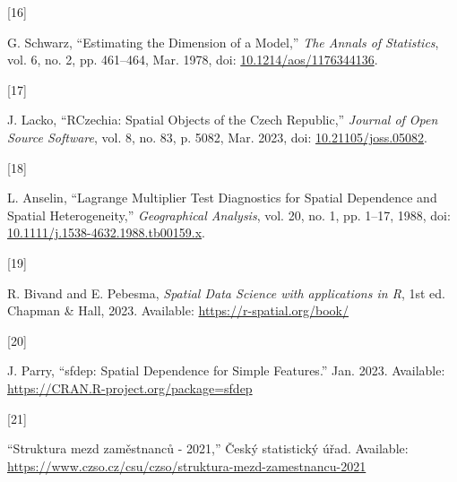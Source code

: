 \documentclass{mmeproc}
\newlength{\cslhangindent}
\newlength{\csllabelwidth}
\newenvironment{CSLReferences}[2] %
 {%
  \setlength{\parindent}{0pt}
  \ifodd #1
  \fi
  \setlength{\parskip}{-2pt}
 }%
 {}
\newcommand{\CSLLeftMargin}[1]{\parbox[t]{\csllabelwidth}{#1}}
\newcommand{\CSLRightInline}[1]{\parbox[t]{\linewidth - \csllabelwidth}{#1}\break}
\begin{document}
\begin{CSLReferences}{0}{0}
\leavevmode{}%
\CSLLeftMargin{{[}16{]} }%
\CSLRightInline{G. Schwarz, {``Estimating the {Dimension} of a
{Model},''} \emph{The Annals of Statistics}, vol. 6, no. 2, pp.
461--464, Mar. 1978, doi:
\href{https://doi.org/10.1214/aos/1176344136}{10.1214/aos/1176344136}.}

\leavevmode{}%
\CSLLeftMargin{{[}17{]} }%
\CSLRightInline{J. Lacko, {``{RCzechia}: {Spatial} {Objects} of the
{Czech} {Republic},''} \emph{Journal of Open Source Software}, vol. 8,
no. 83, p. 5082, Mar. 2023, doi:
\href{https://doi.org/10.21105/joss.05082}{10.21105/joss.05082}.}

\leavevmode{}%
\CSLLeftMargin{{[}18{]} }%
\CSLRightInline{L. Anselin, {``Lagrange {Multiplier} {Test}
{Diagnostics} for {Spatial} {Dependence} and {Spatial}
{Heterogeneity},''} \emph{Geographical Analysis}, vol. 20, no. 1, pp.
1--17, 1988, doi:
\href{https://doi.org/10.1111/j.1538-4632.1988.tb00159.x}{10.1111/j.1538-4632.1988.tb00159.x}.}

\leavevmode{}%
\CSLLeftMargin{{[}19{]} }%
\CSLRightInline{R. Bivand and E. Pebesma, \emph{Spatial {Data} {Science}
with applications in {R}}, 1st ed. Chapman \& Hall, 2023. Available:
\url{https://r-spatial.org/book/}}

\leavevmode{}%
\CSLLeftMargin{{[}20{]} }%
\CSLRightInline{J. Parry, {``{sfdep}: {Spatial} {Dependence} for
{Simple} {Features}.''} Jan. 2023. Available:
\url{https://CRAN.R-project.org/package=sfdep}}

\leavevmode{}%
\CSLLeftMargin{{[}21{]} }%
\CSLRightInline{{``Struktura mezd zaměstnanců - 2021,''} Český
statistický úřad. Available:
\url{https://www.czso.cz/csu/czso/struktura-mezd-zamestnancu-2021}}

\end{CSLReferences}
\end{document}
